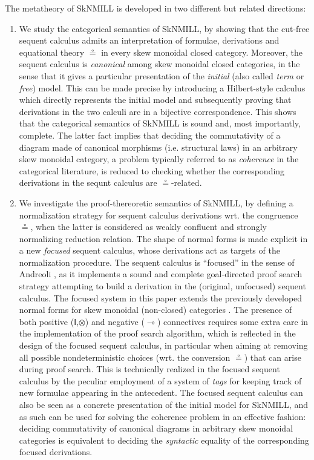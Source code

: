 \documentclass[submission,copyright,creativecommons]{eptcs}
\newcommand{\ot}{\otimes}
\newcommand{\lolli}{\multimap}
\newcommand{\I}{\mathsf{I}}
\begin{document}
The metatheory of SkNMILL is developed in two different but related directions:
\begin{enumerate}[($i$)]
  \item We study the categorical semantics of SkNMILL, by showing that the cut-free sequent calculus admits an interpretation of formulae, derivations and equational theory $\circeq$ in every skew monoidal closed category. Moreover, the sequent calculus is \emph{canonical} among skew monoidal closed categories, in the sense that it gives a particular presentation of the \emph{initial} (also called \emph{term} or \emph{free}) model. This can be made precise by introducing a Hilbert-style calculus which directly represents the initial model and subsequently proving that derivations in the two calculi are in a bijective correspondence.
This shows that the categorical semantics of SkNMILL is sound and, most importantly, complete. The latter fact implies that deciding the commutativity of a diagram made of canonical morphisms (i.e. structural laws) in an arbitrary skew monoidal category, a problem typically referred to as \emph{coherence} in the categorical literature, is reduced to checking whether the corresponding derivations in the sequnt calculus are $\circeq$-related.

\item We investigate the proof-thereoretic semantics of SkNMILL, by defining a normalization strategy for sequent calculus derivations wrt. the congruence $\circeq$, when the latter is considered as weakly confluent and strongly normalizing reduction relation. The shape of normal forms is made explicit in a new \emph{focused} sequent calculus, whose derivations act as targets of the normalization procedure. The sequent calculus is ``focused'' in the sense of Andreoli \cite{andreoli:logic:1992}, as it implements a sound and complete goal-directed proof search strategy attempting to build a derivation in the (original, unfocused) sequent calculus. The focused system in this paper extends the previously
developed normal forms for skew monoidal (non-closed) categories \cite{uustalu:sequent:2018,uustalu:proof:nodate}. The presence of both positive ($\I$,$\ot$) and negative ($\lolli$) connectives requires some extra care in the implementation of the proof search algorithm, which is reflected in the design of the focused sequent calculus, in particular when aiming at removing all possible nondeterministic choices (wrt. the conversion $\circeq$) that can arise during proof search. This is technically realized in the focused sequent calculus by the peculiar employment of a system of \emph{tags} for keeping track of new formulae appearing in the antecedent. The focused sequent calculus can also be seen as a concrete presentation of the initial model for SkNMILL, and as such can be used for solving the coherence problem in an effective fashion: deciding commutativity of canonical diagrams in arbitrary skew monoidal categories is equivalent to deciding the \emph{syntactic} equality of the corresponding focused derivations.
\end{enumerate}
\end{document}
